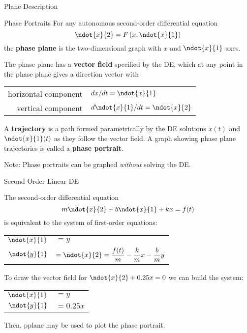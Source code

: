 \documentclass{beamer}
\begin{document}
\begin{frame}{Plane Description}
\begin{block}{Phase Portraits}
For any autonomous second-order differential equation
\begin{equation*}
\ndot{x}{2}=F\left(x,\ndot{x}{1}\right)
\end{equation*}
the \textbf{phase plane} is the two-dimensional graph with $x$ and $\ndot{x}{1}$ axes.\pause

The phase plane has a \textbf{vector field} specified by the DE, which at any point in the phase plane gives a direction vector with
\begin{center}
\begin{tabular}{rl}
horizontal component & $dx/dt=\ndot{x}{1}$ \\
\vspace{2mm}
vertical component & $d\ndot{x}{1}/dt=\ndot{x}{2}$
\end{tabular}
\end{center}\pause
\vspace{-2mm}
A \textbf{trajectory} is a path formed parametrically by the DE solutions $x(t)$ and $\ndot{x}{1}(t)$ as they follow the vector field. A graph showing phase plane trajectories is called a \textbf{phase portrait}.
\end{block}\pause
\begin{block}{}
Note: Phase portraits can be graphed \emph{without} solving the DE\@.
\end{block}
\end{frame}

\begin{frame}{Second-Order Linear DE}
\begin{definition}
The second-order differential equation
\begin{equation*}
m\ndot{x}{2}+b\ndot{x}{1}+kx=f(t)
\end{equation*}
is equivalent to the system of first-order equations:
\begin{center}
\begin{tabular}{rl}
$\ndot{x}{1}$ &$= y$ \\
$\ndot{y}{1}$ &$= \ndot{x}{2} = \dfrac{f(t)}{m}-\dfrac{k}{m}x-\dfrac{b}{m}y$
\end{tabular}
\end{center}
\end{definition}\pause

\begin{example}
To draw the vector field for $\ndot{x}{2}+0.25x=0$ we can build the system:\pause
\begin{center}
\begin{tabular}{rl}
$\ndot{x}{1}$ &$= y$ \\
$\ndot{y}{1}$ &$= 0.25x$
\end{tabular}
\end{center}\pause
\vspace{-2mm}
Then, pplane may be used to plot the phase portrait.
\end{example}
\end{frame}
\end{document}
